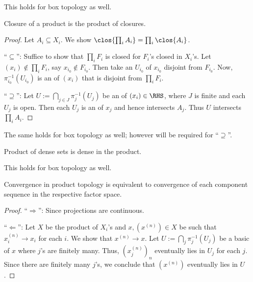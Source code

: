 	\begin{rmk}
		This holds for box topology as well.
	\end{rmk}
	
	\begin{lem}\label{LEM: clos and prods commute}
		Closure of a product is the product of closures.
	\end{lem}
	
	\begin{proof}
		Let $A_i\subseteq X_i$. We show $\clos{\prod_i A_i} = \prod_i\clos{A_i}$.
		
		``$\subseteq$'': Suffice to show that $\prod_i F_i$ is closed for $F_i$'s closed in $X_i$'s. Let $(x_i)\notin\prod_i F_i$, say $x_{i_0}\notin F_{i_0}$. Then take an \onbd $U_{i_0}$ of $x_{i_0}$ disjoint from $F_{i_0}$. Now, $\pi_{i_0}^{-1}(U_{i_0})$ is an \onbd of $(x_i)$ that is disjoint from $\prod_i F_i$.
		
		``$\supseteq$'': Let $U := \bigcap_{j\in J}\pi_j^{-1}(U_j)$ be an \onbd of $(x_i)\in\RHS$, where $J$ is finite and each $U_j$ is open. Then each $U_j$ is an \onbd of $x_j$ and hence intersects $A_j$. Thus $U$ intersects $\prod_i A_i$.
	\end{proof}
	
	\begin{rmk}
		The same holds for box topology as well; however \AC will be required for ``$\supseteq$''.
	\end{rmk}
	
	\begin{cor}
		Product of dense sets is dense in the product.
	\end{cor}
	
	\begin{rmk}
		This holds for box topology as well.
	\end{rmk}
	
	
	\begin{prp}[Convergence]\label{PRP: convergence in prod topo}
		Convergence in product topology is equivalent to convergence of each component sequence in the respective factor space.
	\end{prp}
	
	\begin{proof}
		``$\Rightarrow$'': Since projections are continuous.
		
		``$\Leftarrow$'': Let $X$ be the product of $X_i$'s and $x, (x^{(n)})\in X$ be such that $x^{(n)}_i\to x_i$ for each $i$. We show that $x^{(n)}\to x$. Let $U := \bigcap_j \pi_j^{-1}(U_j)$ be a basic \onbd of $x$ where $j$'s are finitely many. Thus, $(x^{(n)}_j)_n$ eventually lies in $U_j$ for each $j$. Since there are finitely many $j$'s, we conclude that $(x^{(n)})$ eventually lies in $U$.
	\end{proof}
	
